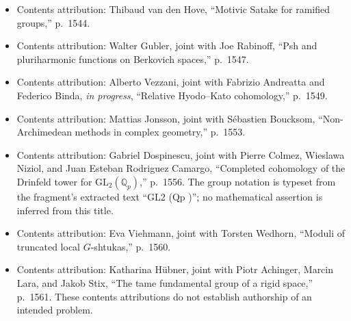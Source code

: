 \documentclass[11pt]{article}
\newcommand{\Q}{\mathbb{Q}}
\begin{document}
\begin{itemize}
\item Contents attribution: Thibaud van den Hove, ``Motivic Satake for ramified groups,'' p.~1544.
\item Contents attribution: Walter Gubler, joint with Joe Rabinoff, ``Psh and pluriharmonic functions on Berkovich spaces,'' p.~1547.
\item Contents attribution: Alberto Vezzani, joint with Fabrizio Andreatta and Federico Binda, \emph{in progress}, ``Relative Hyodo--Kato cohomology,'' p.~1549.
\item Contents attribution: Mattias Jonsson, joint with Sébastien Boucksom, ``Non-Archimedean methods in complex geometry,'' p.~1553.
\item Contents attribution: Gabriel Dospinescu, joint with Pierre Colmez, Wieslawa Niziol, and Juan Esteban Rodriguez Camargo, ``Completed cohomology of the Drinfeld tower for $\mathrm{GL}_{2}(\Q_p)$,'' p.~1556. The group notation is typeset from the fragment's extracted text ``GL2 (Qp )''; no mathematical assertion is inferred from this title.
\item Contents attribution: Eva Viehmann, joint with Torsten Wedhorn, ``Moduli of truncated local $G$-shtukas,'' p.~1560.
\item Contents attribution: Katharina Hübner, joint with Piotr Achinger, Marcin Lara, and Jakob Stix, ``The tame fundamental group of a rigid space,'' p.~1561. These contents attributions do not establish authorship of an intended problem.
\end{itemize}
\end{document}

